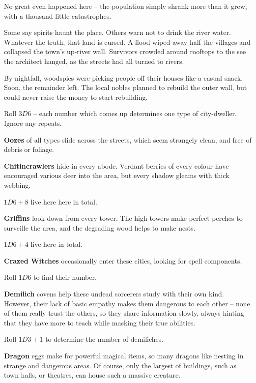 \begin{multicols}{2}
\begin{dlist}
    No great even happened here -- the population simply shrank more than it grew, with a thousand little catastrophes.

    Some say spirits haunt the place.
    Others warn not to drink the river water.
    Whatever the truth, that land is cursed.
  \else
    A flood wiped away half the villages and collapsed the town's up-river wall.
    Survivors crowded around rooftops to the see the architect hanged, as the streets had all turned to rivers.

    By nightfall, woodspies were picking people off their houses like a casual snack.
    Soon, the remainder left.
    The local nobles planned to rebuild the outer wall, but could never raise the money to start rebuilding.
  \fi
\end{dlist}


Roll $3D6$ -- each number which comes up determines one type of city-dweller.
Ignore any repeats.

\begin{dlist}
  \item\label{lostOoze}
  \textbf{Oozes} of all types slide across the streets, which seem strangely clean, and free of debris or foliage.
  \item
  \textbf{Chitincrawlers} hide in every abode.
  Verdant berries of every colour have encouraged various deer into the area, but every shadow gleams with thick webbing.

  $1D6+8$ live here here in total.
  \item
  \textbf{Griffins} look down from every tower.
  The high towers make perfect perches to surveille the area, and the degrading wood helps to make nests.

  $1D6+4$ live here in total.
  \item
  \textbf{Crazed Witches} occasionally enter these cities, looking for spell components.

  Roll $1D6$ to find their number.
  \item\label{lostDemilich}
  \textbf{Demilich} covens help these undead sorcerers study with their own kind.
  However, their lack of basic empathy makes them dangerous to each other -- none of them really trust the others, so they share information slowly, always hinting that they have more to teach while masking their true abilities.

  Roll $1D3 + 1$ to determine the number of demiliches.
  \item
  \textbf{Dragon} eggs make for powerful magical items, so many dragons like nesting in strange and dangerous areas.
  Of course, only the largest of buildings, such as town halls, or theatres, can house such a massive creature.
\end{dlist}


\end{multicols}
